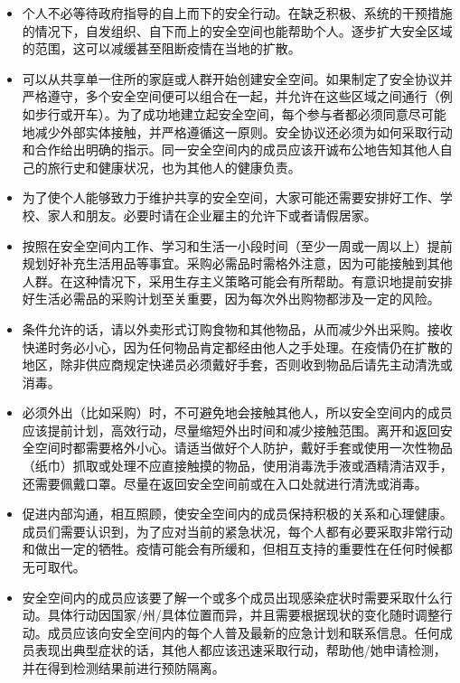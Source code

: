 \documentclass[onecolumn,journal]{IEEEtran}
\begin{document}
\begin{multicols}{2}
\begin{itemize}
\item 个人不必等待政府指导的自上而下的安全行动。在缺乏积极、系统的干预措施的情况下，自发组织、自下而上的安全空间也能帮助个人。逐步扩大安全区域的范围，这可以减缓甚至阻断疫情在当地的扩散。

\item 可以从共享单一住所的家庭或人群开始创建安全空间。如果制定了安全协议并严格遵守，多个安全空间便可以组合在一起，并允许在这些区域之间通行（例如步行或开车）。为了成功地建立起安全空间，每个参与者都必须同意尽可能地减少外部实体接触，并严格遵循这一原则。安全协议还必须为如何采取行动和合作给出明确的指示。同一安全空间内的成员应该开诚布公地告知其他人自己的旅行史和健康状况，也为其他人的健康负责。

\item 为了使个人能够致力于维护共享的安全空间，大家可能还需要安排好工作、学校、家人和朋友。必要时请在企业雇主的允许下或者请假居家。

\item 按照在安全空间内工作、学习和生活一小段时间（至少一周或一周以上）提前规划好补充生活用品等事宜。采购必需品时需格外注意，因为可能接触到其他人群。在这种情况下，采用生存主义策略可能会有所帮助。有意识地提前安排好生活必需品的采购计划至关重要，因为每次外出购物都涉及一定的风险。

\item 条件允许的话，请以外卖形式订购食物和其他物品，从而减少外出采购。接收快递时务必小心，因为任何物品肯定都经由他人之手处理。在疫情仍在扩散的地区，除非供应商规定快递员必须戴好手套，否则收到物品后请先主动清洗或消毒。

\item 必须外出（比如采购）时，不可避免地会接触其他人，所以安全空间内的成员应该提前计划，高效行动，尽量缩短外出时间和减少接触范围。离开和返回安全空间时都需要格外小心。请适当做好个人防护，戴好手套或使用一次性物品（纸巾）抓取或处理不应直接触摸的物品，使用消毒洗手液或酒精清洁双手，还需要佩戴口罩。尽量在返回安全空间前或在入口处就进行清洗或消毒。

\item 促进内部沟通，相互照顾，使安全空间内的成员保持积极的关系和心理健康。成员们需要认识到，为了应对当前的紧急状况，每个人都有必要采取非常行动和做出一定的牺牲。疫情可能会有所缓和，但相互支持的重要性在任何时候都无可取代。

\item 安全空间内的成员应该要了解一个或多个成员出现感染症状时需要采取什么行动。具体行动因国家/州/具体位置而异，并且需要根据现状的变化随时调整行动。成员应该向安全空间内的每个人普及最新的应急计划和联系信息。任何成员表现出典型症状的话，其他人都应该迅速采取行动，帮助他/她申请检测，并在得到检测结果前进行预防隔离。


\end{itemize}
\end{multicols}
\end{document}
